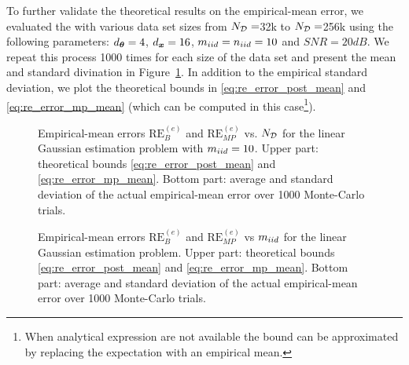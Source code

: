 To further validate the theoretical results on the empirical-mean error, %
we evaluated the \name{} with various data set sizes from {$N_{\mathcal{D}}=$}32k to  {$N_{\mathcal{D}}=$}256k using the following parameters: ${d_{\bm{\theta}}}=4$, ${d_{\bm{x}}}=16$, {$m_{iid}=n_{iid}=10$} and $SNR=20dB$. We repeat this process 1000 times for each size of the data set and present the mean and standard divination in Figure~\ref{fig:sample_error_vs_n_samples}. In addition to the empirical standard deviation, we 
{plot the} theoretical bounds %
in \eqref{eq:re_error_post_mean} and \eqref{eq:re_error_mp_mean} {(which can be computed in this case\footnote{ When analytical expression {are not available} the bound can be approximated by replacing the expectation with an empirical mean.})}.
\begin{figure}
    \centering
    
    \caption{{%
    Empirical-mean errors  %
    $\mathrm{RE}_{B}^{(e)}$ and $\mathrm{RE}_{MP}^{(e)}$ {vs. $N_{\mathcal{D}}$}
    for the linear Gaussian estimation problem {with $m_{iid}=10$}. 
    Upper part: %
    theoretical bounds \eqref{eq:re_error_post_mean} and \eqref{eq:re_error_mp_mean}. %
    Bottom part: %
    average and standard deviation of the actual empirical-mean error over 1000 Monte-Carlo trials. 
    }
    }
    
    \label{fig:sample_error_vs_n_samples}
\end{figure}

\begin{figure}
    \centering
    
    \caption{
    Empirical-mean errors $\mathrm{RE}_{B}^{(e)}$ and $\mathrm{RE}_{MP}^{(e)}$ vs $m_{iid}$
    for the linear Gaussian estimation problem. 
    Upper part: 
    theoretical bounds \eqref{eq:re_error_post_mean} and \eqref{eq:re_error_mp_mean}. 
    Bottom part: 
    average and standard deviation of the actual empirical-mean error over 1000 Monte-Carlo trials. 
    }
    \label{fig:sample_error_vs_m_iid_samples}
\end{figure}

